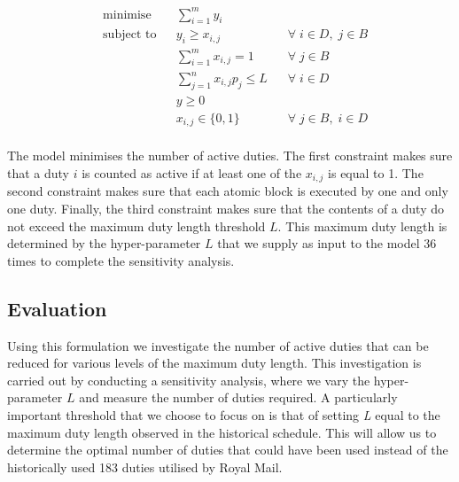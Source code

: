 \vspace{\baselineskip}
\begin{equation}
\label{equation: Minimise Duties}
\begin{aligned}
&\text{minimise}
& & \sum _{i=1}^m y_{i}  \\
& \text{subject to}
& & y_{i} \geq x_{i,j}  \;\;\; &\forall \; i \in D,\; j \in B\\   
& & &\sum _{i=1}^m x_{i,j} = 1 \;\;\; &\forall \; j \in B\\
& & &\sum _{j=1}^n x_{i,j}p_{j} \leq L \;\;\; &\forall \; i \in D\\
& & & y\geq 0  \\
& & & x_{i,j} \in  \{ 0,1 \} \;\;\; &\forall \; j \in B, \; i \in D\\
\end{aligned}
\end{equation}

\vspace{\baselineskip}
\noindent
The model minimises the number of active duties. The first constraint makes sure that a duty $i$ is counted as active if at least one of the $x_{i,j}$ is equal to 1. The second constraint makes sure that each atomic block is executed by one and only one duty. Finally, the third constraint makes sure that the contents of a duty do not exceed the maximum duty length threshold $L$. This maximum duty length is determined by the hyper-parameter $L$ that we supply as input to the model 36 times to complete the sensitivity analysis. 


\subsection*{Evaluation}
\vspace{\baselineskip}
\noindent
Using this formulation we investigate the number of active duties that can be reduced for various levels of the maximum duty length. This investigation is carried out by conducting a sensitivity analysis, where we vary the hyper-parameter $L$ and measure the number of duties required. A particularly important threshold that we choose to focus on is that of setting \textit{L} equal to the maximum duty length observed in the historical schedule. This will allow us to determine the optimal number of duties that could have been used instead of the historically used 183 duties utilised by Royal Mail. 

